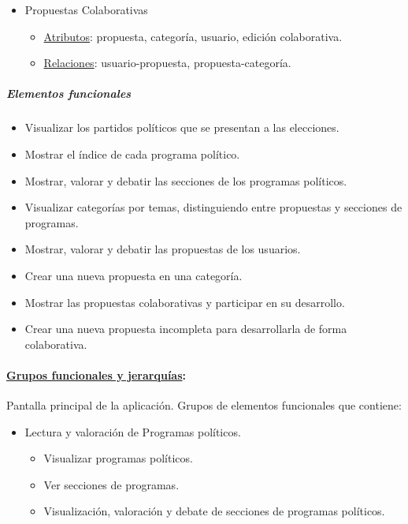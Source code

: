 \begin{itemize}
 \item Propuestas Colaborativas
 \begin{itemize}
  \item \underline{Atributos}: propuesta, categoría, usuario, edición colaborativa.
  \item \underline{Relaciones}:  usuario-propuesta, propuesta-categoría.
 \end{itemize}
\end{itemize}

\subparagraph{Elementos funcionales}

 \begin{itemize}
  \item Visualizar los partidos políticos que se presentan a las elecciones.
  \item Mostrar el índice de cada programa político.
  \item Mostrar, valorar y debatir las secciones de los programas políticos.
  \item Visualizar categorías por temas, distinguiendo entre propuestas y secciones de programas.
  \item Mostrar, valorar y debatir las propuestas de los usuarios.
  \item Crear una nueva propuesta en una categoría.
  \item Mostrar las propuestas colaborativas y participar en su desarrollo.
  \item Crear una nueva propuesta incompleta para desarrollarla de forma colaborativa.
 \end{itemize}

\paragraph{\underline{Grupos funcionales y jerarquías}:}

Pantalla principal de la aplicación. Grupos de elementos funcionales que contiene:

\begin{itemize}
 \item Lectura y valoración de Programas políticos.
 \begin{itemize}
  \item Visualizar programas políticos.
  \item Ver secciones de programas.
  \item Visualización, valoración y debate de secciones de programas políticos.
 \end{itemize}
\end{itemize}

